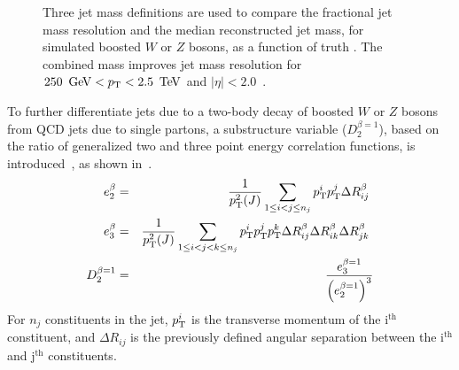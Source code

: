 \begin{figure}[tbp]
\begin{center}
\end{center}
\caption[Performance of combined mass for large-R jets]{Three jet mass definitions are used to compare \protect{} the fractional jet mass resolution and \protect{} the median reconstructed jet mass, for simulated boosted $W$ or $Z$ bosons, as a function of truth \pT. The combined mass improves jet mass resolution for $250\,\GeV<\pT<2.5\,\TeV$ and $|\eta|<2.0$~\cite{jet_track_mass}.}
\label{fig:m_comb_res}
\end{figure}


To further differentiate jets due to a two-body decay of boosted $W$ or $Z$ bosons from QCD jets due to single partons, a substructure variable ($D_2^{\beta=1}$), based on the ratio of generalized two and three point energy correlation functions, is introduced~\cite{d2_one, d2_two}, as shown in~\Eqnrange{\ref{eq:en_corr_func}}{\ref{eq:d2_def}}. 
\begin{eqnarray}
e_2^{\beta} & = & \frac{1}{\pT^2(J)}\sum_{1\leq i<j\leq n_j}\pT^i\pT^j\Delta R_{ij}^{\beta}  \label{eq:en_corr_func} \\
e_3^{\beta} & = & \frac{1}{\pT^2(J)}\sum_{1\leq i<j<k\leq n_j}\pT^i\pT^j\pT^k\Delta R_{ij}^{\beta}\Delta R_{ik}^{\beta}\Delta R_{jk}^{\beta} \\
D_{2}^{\beta=1} & = & \frac{e_3^{\beta=1}}{\left(e_2^{\beta=1}\right)^3} \label{eq:d2_def}
\end{eqnarray}
For $n_j$ constituents in the jet, $p_{\text{T}}^i$ is the transverse momentum of the i$^{\textrm{th}}$ constituent, and $\Delta R_{ij}$ is the previously defined angular separation between the i$^{\textrm{th}}$ and j$^{\textrm{th}}$ constituents.

